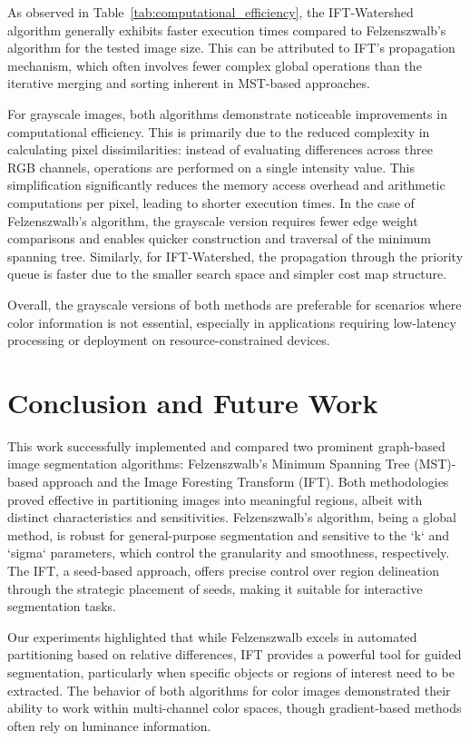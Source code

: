 \documentclass{sbc2023}
\begin{document}
As observed in Table~\ref{tab:computational_efficiency}, the IFT-Watershed algorithm generally exhibits faster execution times compared to Felzenszwalb's algorithm for the tested image size. This can be attributed to IFT's propagation mechanism, which often involves fewer complex global operations than the iterative merging and sorting inherent in MST-based approaches. 

For grayscale images, both algorithms demonstrate noticeable improvements in computational efficiency. This is primarily due to the reduced complexity in calculating pixel dissimilarities: instead of evaluating differences across three RGB channels, operations are performed on a single intensity value. This simplification significantly reduces the memory access overhead and arithmetic computations per pixel, leading to shorter execution times. In the case of Felzenszwalb's algorithm, the grayscale version requires fewer edge weight comparisons and enables quicker construction and traversal of the minimum spanning tree. Similarly, for IFT-Watershed, the propagation through the priority queue is faster due to the smaller search space and simpler cost map structure.

Overall, the grayscale versions of both methods are preferable for scenarios where color information is not essential, especially in applications requiring low-latency processing or deployment on resource-constrained devices.

\section{Conclusion and Future Work}
\label{sec:conclusion}

This work successfully implemented and compared two prominent graph-based image segmentation algorithms: Felzenszwalb's Minimum Spanning Tree (MST)-based approach and the Image Foresting Transform (IFT). Both methodologies proved effective in partitioning images into meaningful regions, albeit with distinct characteristics and sensitivities. Felzenszwalb's algorithm, being a global method, is robust for general-purpose segmentation and sensitive to the `k` and `sigma` parameters, which control the granularity and smoothness, respectively. The IFT, a seed-based approach, offers precise control over region delineation through the strategic placement of seeds, making it suitable for interactive segmentation tasks.

Our experiments highlighted that while Felzenszwalb excels in automated partitioning based on relative differences, IFT provides a powerful tool for guided segmentation, particularly when specific objects or regions of interest need to be extracted. The behavior of both algorithms for color images demonstrated their ability to work within multi-channel color spaces, though gradient-based methods often rely on luminance information.
\end{document}
